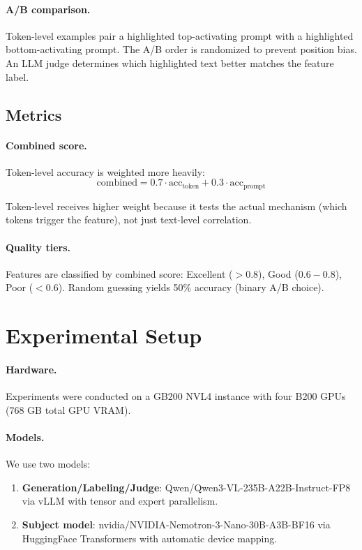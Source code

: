 \documentclass[runningheads]{llncs}
\begin{document}
\paragraph{A/B comparison.} Token-level examples pair a highlighted top-activating prompt with a highlighted bottom-activating prompt. The A/B order is randomized to prevent position bias. An LLM judge determines which highlighted text better matches the feature label.

\subsection{Metrics}

\paragraph{Combined score.} Token-level accuracy is weighted more heavily:
\begin{equation}
\text{combined} = 0.7 \cdot \text{acc}_\text{token} + 0.3 \cdot \text{acc}_\text{prompt}
\end{equation}

Token-level receives higher weight because it tests the actual mechanism (which tokens trigger the feature), not just text-level correlation.

\paragraph{Quality tiers.} Features are classified by combined score: Excellent ($> 0.8$), Good ($0.6 - 0.8$), Poor ($< 0.6$). Random guessing yields 50\% accuracy (binary A/B choice).


\section{Experimental Setup}
\label{sec:experiments}

\paragraph{Hardware.} Experiments were conducted on a GB200 NVL4 instance with four B200 GPUs (768 GB total GPU VRAM).

\paragraph{Models.} We use two models:
\begin{enumerate}
\item \textbf{Generation/Labeling/Judge}: Qwen/Qwen3-VL-235B-A22B-Instruct-FP8 via vLLM with tensor and expert parallelism.
\item \textbf{Subject model}: nvidia/NVIDIA-Nemotron-3-Nano-30B-A3B-BF16 via HuggingFace Transformers with automatic device mapping.
\end{enumerate}
\end{document}
